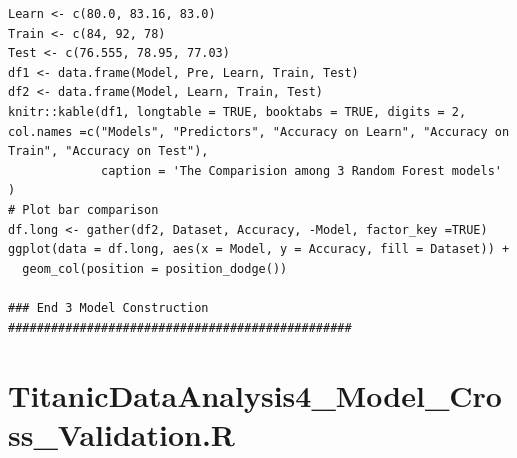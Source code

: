 \documentclass[
]{book}
\begin{document}
\begin{verbatim}
Learn <- c(80.0, 83.16, 83.0)
Train <- c(84, 92, 78)
Test <- c(76.555, 78.95, 77.03)
df1 <- data.frame(Model, Pre, Learn, Train, Test)
df2 <- data.frame(Model, Learn, Train, Test)
knitr::kable(df1, longtable = TRUE, booktabs = TRUE, digits = 2, col.names =c("Models", "Predictors", "Accuracy on Learn", "Accuracy on Train", "Accuracy on Test"),
             caption = 'The Comparision among 3 Random Forest models'
)
# Plot bar comparison
df.long <- gather(df2, Dataset, Accuracy, -Model, factor_key =TRUE)
ggplot(data = df.long, aes(x = Model, y = Accuracy, fill = Dataset)) +
  geom_col(position = position_dodge())

### End 3 Model Construction ################################################
\end{verbatim}

\hypertarget{titanicdataanalysis4_model_cross_validation.r}{%
\section*{TitanicDataAnalysis4\_Model\_Cross\_Validation.R}\label{titanicdataanalysis4_model_cross_validation.r}}
\end{document}
